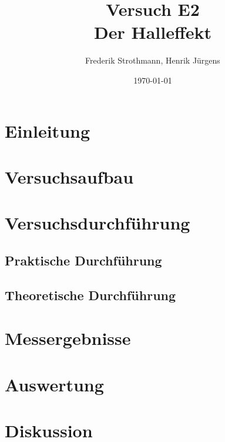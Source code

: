 \documentclass[12pt]{scrartcl}
\title{Versuch E2\\ Der Halleffekt}
\author{Frederik Strothmann, Henrik Jürgens}
\date{\today}
\begin{document}

\maketitle



\section{Einleitung}



\section{Versuchsaufbau}


\section{Versuchsdurchführung}


\subsection{Praktische Durchführung}


\subsection{Theoretische Durchführung}


\section{Messergebnisse}



\section{Auswertung}


\section{Diskussion}


\end{document}
